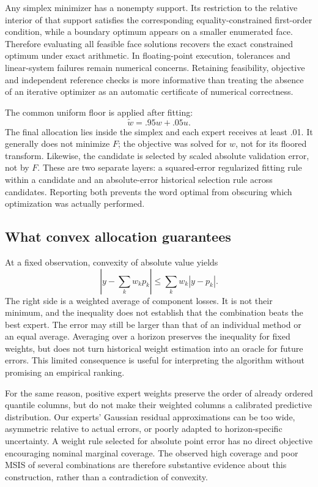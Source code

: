 Any simplex minimizer has a nonempty support. Its restriction to the relative interior of that support satisfies the corresponding equality-constrained first-order condition, while a boundary optimum appears on a smaller enumerated face. Therefore evaluating all feasible face solutions recovers the exact constrained optimum under exact arithmetic. In floating-point execution, tolerances and linear-system failures remain numerical concerns. Retaining feasibility, objective and independent reference checks is more informative than treating the absence of an iterative optimizer as an automatic certificate of numerical correctness.

The common uniform floor is applied after fitting:
\begin{equation}\label{eq:postfit-floor}
\widetilde w=.95w+.05u.
\end{equation}
The final allocation lies inside the simplex and each expert receives at least .01. It generally does not minimize $F$; the objective was solved for $w$, not for its floored transform. Likewise, the candidate is selected by scaled absolute validation error, not by $F$. These are two separate layers: a squared-error regularized fitting rule within a candidate and an absolute-error historical selection rule across candidates. Reporting both prevents the word optimal from obscuring which optimization was actually performed.

\subsection{What convex allocation guarantees}
At a fixed observation, convexity of absolute value yields
\begin{equation}\label{eq:jensen-error}
\left|y-\sum_kw_kp_k\right|\le\sum_kw_k|y-p_k|.
\end{equation}
The right side is a weighted average of component losses. It is not their minimum, and the inequality does not establish that the combination beats the best expert. The error may still be larger than that of an individual method or an equal average. Averaging over a horizon preserves the inequality for fixed weights, but does not turn historical weight estimation into an oracle for future errors. This limited consequence is useful for interpreting the algorithm without promising an empirical ranking.

For the same reason, positive expert weights preserve the order of already ordered quantile columns, but do not make their weighted columns a calibrated predictive distribution. Our experts' Gaussian residual approximations can be too wide, asymmetric relative to actual errors, or poorly adapted to horizon-specific uncertainty. A weight rule selected for absolute point error has no direct objective encouraging nominal marginal coverage. The observed high coverage and poor MSIS of several combinations are therefore substantive evidence about this construction, rather than a contradiction of convexity.

